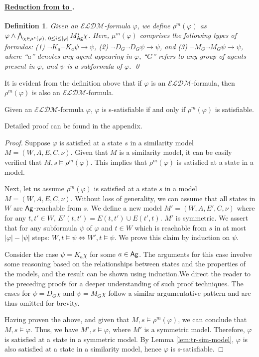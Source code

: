 \documentclass{article}
\newtheorem{definition}[theorem]{Definition}%
\newcommand{\ab}{\ensuremath{A}\xspace}
\newcommand{\ag}{\text{\normalfont\textsf{Ag}}\xspace}
\renewcommand{\phi}{\varphi}
\newcommand{\ra}{\rightarrow}
\newcommand{\langdm}{\ensuremath{\mathcal{ELDM}}\xspace}
\newcommand{\ldm}{\text{\normalfont ELDM}\xspace}
\newcommand{\lsdm}{\text{\normalfont ELDM$^s$}\xspace}
\begin{document}
\paragraph{\bfseries\underline{Reduction from \lsdm to \ldm}.}
\begin{definition}\label{def:rewrite-m}
Given an $\langdm$-formula $\phi$, we define $\rho^m(\phi)$ as $\phi \wedge \bigwedge_{\chi \in \mu^s(\phi),\ 0\leq i\leq |\phi|} M_\ag^i \chi$.
Here, $\mu^m(\phi)$ comprises the following types of formulas:
(1) $\neg K_a \neg K_a\psi \ra \psi$, (2) $\neg D_G \neg D_G\psi \ra \psi$, and (3) $\neg M_G \neg M_G\psi \ra \psi$, where ``$a$'' denotes any agent appearing in $\phi$, ``$G$'' refers to any group of agents present in $\phi$, and $\psi$ is a subformula of $\phi$.
\qed
\end{definition}

It is evident from the definition above that if $\phi$ is an $\langdm$-formula, then $\rho^m(\phi)$ is also an $\langdm$-formula.

\begin{propositionrep}\label{lem:sat-sdm2dm}
Given an $\langdm$-formula $\phi$, $\phi$ is s-satisfiable if and only if $\rho^m(\phi)$ is satisfiable.
\end{propositionrep}
\begin{inlineproof}
Detailed proof can be found in the appendix.
\end{inlineproof}
\begin{proof}
Suppose $\phi$ is satisfied at a state $s$ in a similarity model $M=(W,\ab,E,C,\nu)$. Given that $M$ is a similarity model, it can be easily verified that $M,s\models\rho^m(\phi)$. This implies that $\rho^m(\phi)$ is satisfied at a state in a model.

Next, let us assume $\rho^m(\phi)$ is satisfied at a state $s$ in a model $M=(W,\ab,E,C,\nu)$. Without loss of generality, we can assume that all states in $W$ are $\ag$-reachable from $s$.
We define a new model $M'=(W,\ab,E',C,\nu)$ where for any $t,t'\in W$, $E'(t,t')=E(t,t')\cup E(t',t)$. $M'$ is symmetric. We assert that for any subformula $\psi$ of $\phi$ and $t\in W$ which is reachable from $s$ in at most $|\phi|-|\psi|$ steps: $W,t\models\psi \Longleftrightarrow W',t\models\psi$. We prove this claim by induction on $\psi$.

Consider the case $\psi=K_a\chi$ for some $a\in\ag$. The arguments for this case involve some reasoning based on the relationships between states and the properties of the models, and the result can be shown using induction.We direct the reader to the preceding proofs for a deeper understanding of such proof techniques. The cases for $\psi=D_G\chi$ and $\psi=M_G\chi$ follow a similar argumentative pattern and are thus omitted for brevity.

Having proven the above, and given that $M,s\models\rho^m(\phi)$, we can conclude that $M,s\models\phi$. Thus, we have $M',s\models\phi$, where $M'$ is a symmetric model. Therefore, $\phi$ is satisfied at a state in a symmetric model. By Lemma \ref{lem:tr-sim-model}, $\phi$ is also satisfied at a state in a similarity model, hence $\phi$ is s-satisfiable.
\end{proof}
\end{document}
